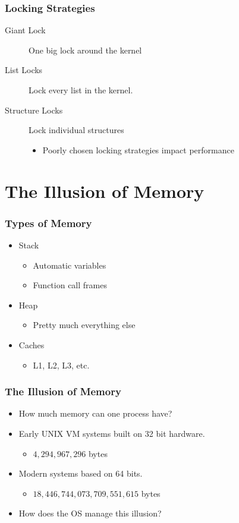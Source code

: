 \documentclass[pdftex]{beamer} %
\begin{document}
\begin{frame}
  \frametitle{Locking Strategies}
  \begin{description}
  \item [Giant Lock] One big lock around the kernel
  \item [List Locks] Lock every list in the kernel.
  \item [Structure Locks] Lock individual structures
    \begin{itemize}
    \item Poorly chosen locking strategies impact performance
    \end{itemize}
  \end{description}
\end{frame}



\section{The Illusion of Memory}
\label{sec:memory}

\begin{frame}
  \frametitle{Types of Memory}
  \begin{itemize}
  \item Stack
    \begin{itemize}
    \item Automatic variables
    \item Function call frames
    \end{itemize}
\pause
  \item Heap
    \begin{itemize}
    \item Pretty much everything else
    \end{itemize}
  \item Caches
    \begin{itemize}
    \item L1, L2, L3, etc.
    \end{itemize}
  \end{itemize}
\end{frame}

\begin{frame}
  \frametitle{The Illusion of Memory}
  \begin{itemize}
  \item How much memory can one process have?
  \item Early UNIX VM systems built on 32 bit hardware.
    \pause
    \begin{itemize}
    \item $4,294,967,296$ bytes
    \end{itemize}
    \pause
  \item Modern systems based on 64 bits.
    \begin{itemize}
    \item $18,446,744,073,709,551,615$ bytes
    \end{itemize}
  \item How does the OS manage this illusion?
  \end{itemize}
\end{frame}
\end{document}
